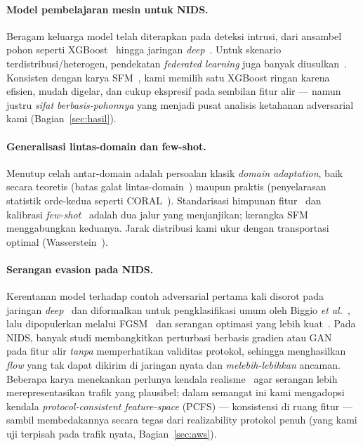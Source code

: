\documentclass[11pt,a4paper]{article}
\begin{document}
\paragraph{Model pembelajaran mesin untuk NIDS.} Beragam keluarga model telah
diterapkan pada deteksi intrusi, dari ansambel pohon seperti
XGBoost~\cite{xgboost,husain,zhou} hingga jaringan
\emph{deep}~\cite{shone,wu,duan}. Untuk skenario terdistribusi/heterogen,
pendekatan \emph{federated learning} juga banyak diusulkan~\cite{popoola,bertoli,agrawal,nidsfgpa}.
Konsisten dengan karya SFM~\cite{martono2024sfm}, kami memilih satu XGBoost ringan
karena efisien, mudah digelar, dan cukup ekspresif pada sembilan fitur alir --- namun
justru \emph{sifat berbasis-pohonnya} yang menjadi pusat analisis ketahanan
adversarial kami (Bagian~\ref{sec:hasil}).

\paragraph{Generalisasi lintas-domain dan few-shot.} Menutup celah antar-domain
adalah persoalan klasik \emph{domain adaptation}, baik secara teoretis (batas galat
lintas-domain~\cite{bendavid}) maupun praktis (penyelarasan statistik orde-kedua
seperti CORAL~\cite{coral}). Standarisasi himpunan fitur~\cite{sarhan,sarhannf} dan
kalibrasi \emph{few-shot}~\cite{fewshot} adalah dua jalur yang menjanjikan; kerangka
SFM~\cite{martono2024sfm} menggabungkan keduanya. Jarak distribusi kami ukur dengan
transportasi optimal (Wasserstein~\cite{wasserstein}).

\paragraph{Serangan evasion pada NIDS.} Kerentanan model terhadap contoh adversarial
pertama kali disorot pada jaringan \emph{deep}~\cite{szegedy2014} dan diformalkan
untuk pengklasifikasi umum oleh Biggio \emph{et al.}~\cite{biggio2013}, lalu
dipopulerkan melalui FGSM~\cite{goodfellow2015} dan serangan optimasi yang lebih
kuat~\cite{carlini2017}. Pada NIDS, banyak studi membangkitkan perturbasi berbasis
gradien atau GAN~\cite{lin2022idsgan,alhajjar2021,sheatsley2022} pada fitur alir
\emph{tanpa} memperhatikan validitas protokol, sehingga menghasilkan \emph{flow}
yang tak dapat dikirim di jaringan nyata dan \emph{melebih-lebihkan} ancaman.
Beberapa karya menekankan perlunya kendala realisme~\cite{apruzzese2023,merzouk2022}
agar serangan lebih merepresentasikan trafik yang plausibel; dalam semangat ini kami
mengadopsi kendala \emph{protocol-consistent feature-space} (PCFS) --- konsistensi
di ruang fitur --- sambil membedakannya secara tegas dari realizability protokol
penuh (yang kami uji terpisah pada trafik nyata, Bagian~\ref{sec:aws}).
\end{document}
